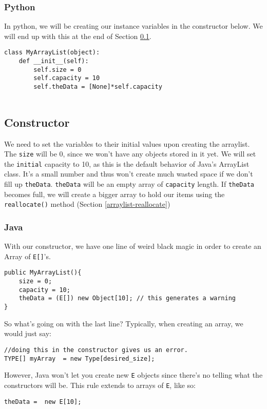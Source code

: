 \subsubsection{Python}
In python, we will be creating our instance variables in the constructor below.  We will end up with this at the end of Section \ref{arraylist-constructor}.

\begin{verbatim}
class MyArrayList(object):
	def __init__(self):
		self.size = 0
		self.capacity = 10
		self.theData = [None]*self.capacity
	
\end{verbatim}


\subsection{Constructor}
\label{arraylist-constructor}

We need to set the variables to their initial values upon creating the arraylist.
The \texttt{size} will be 0, since we won't have any objects stored in it yet.
We will set the \texttt{initial} capacity to 10, as this is the default behavior of Java's ArrayList class.  
It's a small number and thus won't create much wasted space if we don't fill up \texttt{theData}.
\texttt{theData} will be an empty array of \texttt{capacity} length.
If \texttt{theData} becomes full, we will create a bigger array to hold our items using the \texttt{reallocate()} method (Section \ref{arraylist-reallocate})  %


\subsubsection{Java}
With our constructor, we have one line of weird black magic in order to create an Array of \texttt{E[]}'s.
\begin{verbatim}
public MyArrayList(){
	size = 0;
	capacity = 10;
	theData = (E[]) new Object[10]; // this generates a warning
}
\end{verbatim}

So what's going on with the last line?
Typically, when creating an array, we would just say:

\begin{verbatim}
//doing this in the constructor gives us an error.
TYPE[] myArray  = new Type[desired_size];
\end{verbatim}

However, Java won't let you create new \texttt{E} objects since there's no telling what the constructors will be.  This rule extends to arrays of \texttt{E}, like so:
\begin{verbatim}
theData =  new E[10];
\end{verbatim}

